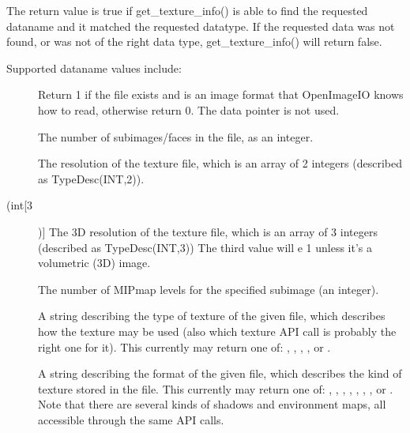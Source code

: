 The return value is {\cf true} if {\cf get_texture_info()} is able
to find the requested {\cf dataname} and it matched the requested
{\cf datatype}.  If the requested data was not found, or was not
of the right data type, {\cf get_texture_info()} will return {\cf false}.

Supported {\cf dataname} values include:

\begin{description}
\item[\spc] \spc \vspace{-12pt} 
\item[\rm {}] Return 1 if the file exists and
is an image format that OpenImageIO knows how to read, otherwise return
0.  The {\cf data} pointer is not used.

\item[\rm {}] The number of subimages/faces in the file, as an integer.

\item[\rm {}] The resolution of the texture file, which
is an array of 2 integers (described as {\cf TypeDesc(INT,2)}).

\item[\rm {} (int[3])] The 3D resolution of the texture file, which
is an array of 3 integers (described as {\cf TypeDesc(INT,3)})  The
third value will e 1 unless it's a volumetric (3D) image.

\item[\rm {}] The number of MIPmap levels for the specified
subimage (an integer).

\item[\rm {}] A string describing the type of texture
of the given file, which describes how the texture may be used (also
which texture API call is probably the right one for it).
This currently may return one of: , ,
, , 
or .

\item[\rm {}] A string describing the format of the
given file, which describes the kind of texture stored in the file.
This currently may return one of: , ,
, , , , , or .
Note that there are several kinds of shadows and environment maps,
all accessible through the same API calls.


\end{description}
